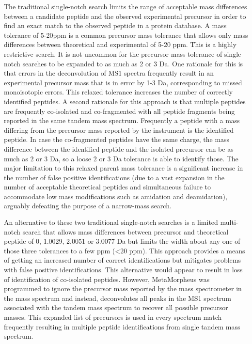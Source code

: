 \documentclass[journal=jprobs,manuscript=article]{achemso}
\begin{document}
The traditional single-notch search limits the range of acceptable mass differences between a candidate peptide and the observed experimental precursor in order to find an exact match to the observed peptide in a protein database.
A mass tolerance of 5-20ppm is a common precursor mass tolerance that allows only mass differences between theoretical and experimental of 5-20 ppm.
This is a highly restrictive search.
It is not uncommon for the precursor mass tolerance of single-notch searches to be expanded to as much as 2 or 3 Da.
One rationale for this is that errors in the deconvolution of MS1 spectra frequently result in an experimental precursor mass that is in error by 1-3 Da, corresponding to missed monoisotopic errors.
This relaxed tolerance increases the number of correctly identified peptides.
A second rationale for this approach is that multiple peptides are frequently co-isolated and co-fragmented with all peptide fragments being reported in the same tandem mass spectrum.
Frequently a peptide with a mass differing from the precursor mass reported by the instrument is the identified peptide.
In case the co-fragmented peptides have the same charge, the mass difference between the identified peptide and the isolated precursor can be as much as 2 or 3 Da, so a loose 2 or 3 Da tolerance is able to identify those.
The major limitation to this relaxed parent mass tolerance is a significant increase in the number of false positive identifications (due to a vast expansion in the number of acceptable theoretical peptides and simultaneous failure to accommodate low mass modifications such as amidation and deamidation), arguably defeating the purpose of a narrow-mass search.
 
An alternative to these two traditional single-notch searches is a limited multi-notch search that allows mass differences between precursor and theoretical peptide of 0, 1.0029, 2.0051 or 3.0077 Da but limits the width about any one of those three tolerances to a few ppm (<20 ppm).
This approach provides a means of getting an increased number of correct identifications but mitigates problems with false positive identifications.
This alternative would appear to result in loss of identification of co-isolated peptides.
However, MetaMorpheus was programmed to ignore the precursor mass reported by the mass spectrometer in the mass spectrum and instead, deconvolutes all peaks in the MS1 spectrum associated with the tandem mass spectrum to recover all possible precursor masses.
This expanded list of precursors is used in every spectrum match frequently resulting in multiple peptide identifications from single tandem mass spectrum.  
\end{document}
